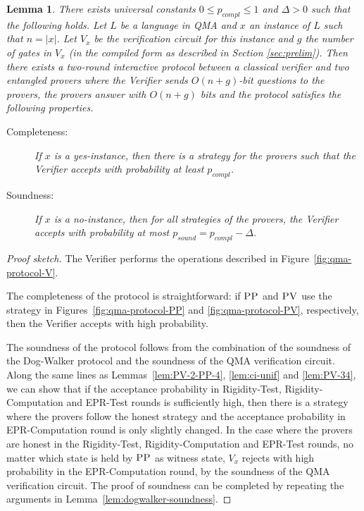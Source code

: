 \documentclass[11pt]{article}
\newtheorem{lemma}[theorem]{Lemma}
\theoremstyle{remark}
\theoremstyle{definition}
\newcommand{\pv}{\textsc{PV}}
\newcommand{\pp}{\textsc{PP}}
\begin{document}
\begin{lemma}
There
  exists universal constants $0\leq p_{compl}\leq 1$ and $\Delta >0$ such that the following holds. 
Let $L$ be a language in QMA and $x$ an instance of $L$ such that $n = |x|$. Let  $V_x$ be the
  verification circuit for this instance and $g$ the number of gates in $V_x$
  (in the compiled form as described in Section \ref{sec:prelim}). Then there exists a two-round interactive protocol
between a classical verifier and two entangled provers where the Verifier
sends  $O(n + g)$-bit questions to the provers, the provers answer with $O(n + g)$ bits and the protocol satisfies the following properties.
\begin{description}
\item[Completeness:] If $x$ is a yes-instance, then  there is a strategy for the provers such that the Verifier accepts with probability  at least $p_{compl}$.
\item[Soundness:] If $x$ is a no-instance, then for all strategies of the provers, the Verifier accepts with  probability at most
$p_{sound} = p_{compl} - \Delta$.
\end{description}
\end{lemma}
\begin{proof}[Proof sketch]
The Verifier performs the operations described in Figure~\ref{fig:qma-protocol-V}. 

  The completeness of the protocol is straightforward: if $\pp$ and $\pv$ use the strategy in Figures~\ref{fig:qma-protocol-PP} and \ref{fig:qma-protocol-PV}, respectively, then the Verifier accepts with  high probability.

  The soundness of the protocol follows from the combination of the soundness of the
  Dog-Walker protocol and the soundness of the QMA verification circuit. Along the same lines as 
  Lemmas~\ref{lem:PV-2-PP-4}, \ref{lem:ci-unif} and \ref{lem:PV-34},
  we can show that if
  the acceptance probability in Rigidity-Test, Rigidity-Computation and
  EPR-Test rounds
  is sufficiently high, then there is a strategy where the provers follow the honest
  strategy and the acceptance probability in EPR-Computation round is only slightly
  changed.  
  In the case where the provers are honest in the Rigidity-Test, Rigidity-Computation and EPR-Test rounds, no matter which state is held
  by $\pp$ as witness state, $V_x$ rejects with high probability in the EPR-Computation round, by the
  soundness of the QMA verification circuit.  The proof of soundness can be completed by repeating the
  arguments in Lemma~\ref{lem:dogwalker-soundness}.
\end{proof}




\end{document}
